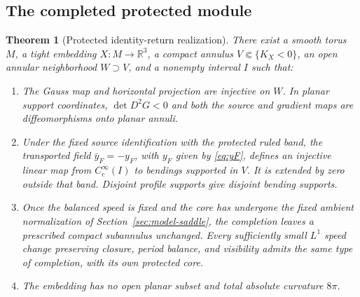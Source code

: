 \documentclass[11pt]{amsart}
\newtheorem{theorem}{Theorem}[section]
\theoremstyle{definition}
\theoremstyle{remark}
\newcommand{\R}{\mathbb R}\newcommand{\Sph}{\mathbb S}
\numberwithin{equation}{section}
\begin{document}
\subsection{The completed protected module}\label{sec:realization}
\begin{theorem}[Protected identity-return realization]\label{thm:protected-realization}
There exist a smooth torus $M$, a tight embedding $X:M\to\R^3$, a
compact annulus $V\Subset\{K_X<0\}$, an open annular neighborhood
$W\supset V$, and a nonempty interval $I$ such that:
\begin{enumerate}[label=\textup{(\roman*)}]
\item The Gauss map and horizontal projection are injective on $W$.
In planar support coordinates, $\det D^2G<0$ and both the source and
gradient maps are diffeomorphisms onto planar annuli.
\item Under the fixed source identification with the protected ruled
band, the transported field $\bar y_F=-y_F$, with $y_F$ given by
\eqref{eq:yF}, defines an injective linear map from $C_c^\infty(I)$
to bendings supported in $V$. It is extended by zero outside that band.
Disjoint profile supports give disjoint bending supports.
\item Once the balanced speed is fixed and the core has undergone the
fixed ambient normalization of Section~\ref{sec:model-saddle}, the
completion leaves a prescribed compact subannulus unchanged. Every sufficiently small $L^1$
speed change preserving closure, period balance, and visibility admits
the same type of completion, with its own protected core.
\item The embedding has no open planar subset and total absolute curvature
$8\pi$.
\end{enumerate}
\end{theorem}
\end{document}
